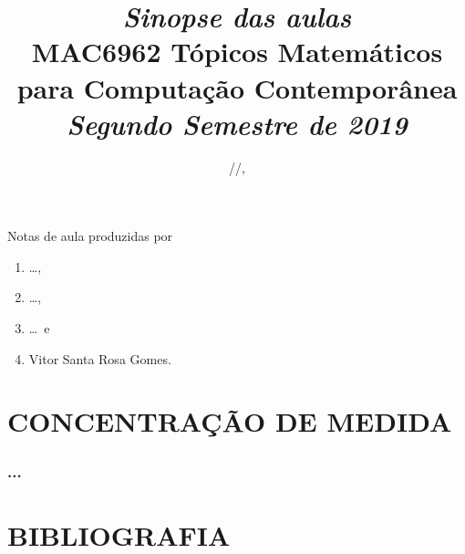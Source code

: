 


\linenumbers

\title[MAC6962 Tópicos Matemáticos para Computação Contemporânea]{%
{\small\sl Sinopse das aulas}\\\bigskip
MAC6962 Tópicos Matemáticos para Computação Contemporânea\\\bigskip
{\it Segundo Semestre de 2019}
}

\address{Instituto de Matemática e Estatística, Universidade de São
  Paulo, Rua do Matão 1010, 05508--090~São Paulo, SP}


\yyyymmdddate
\shortdate
\def\today{\number\year/\number\month/\number\day}
\date{\today, \currenttime}
\footskip=28pt


\maketitle

\section*{}
\label{sec:prefacio}
\doublespace
Notas de aula produzidas por
\begin{enumerate}[label=\nplain]
  \item \dots,
  \item \dots,
  \item \dots\ e
  \item Vitor Santa Rosa Gomes.
\end{enumerate}

\endgroup
\newpage\onehalfspace
\tableofcontents
\pagestyle{fancy}

\endgroup
\doublespace

\newpage
\part{CONCENTRAÇÃO DE MEDIDA}

\section{...}
\label{...}




% 


\newpage
\part{BIBLIOGRAFIA}

%


\endgroup


